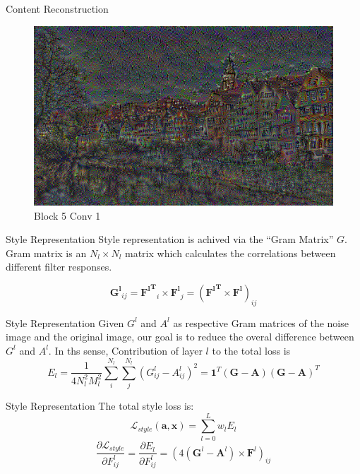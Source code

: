 \documentclass{beamer}
\begin{document}
\begin{frame}{Content Reconstruction}
\begin{figure}[ht]
\centering
\caption{Block 5 Conv 1}
\includegraphics[width=\textwidth]{img/content/block5_conv1.png}
\end{figure}
\end{frame}

\begin{frame}{Style Representation}
Style representation is achived via the ``Gram Matrix'' $G$. Gram matrix is
an $N_l \times N_l$ matrix which calculates the correlations between
different filter responses.

\begin{equation}
    \mathbf{G^l}_{ij} = \mathbf{{F^l}^T}_i \times \mathbf{F^l}_j
    = (\mathbf{{F^l}^T} \times \mathbf{F^l})_{ij}
\end{equation}
\end{frame}

\begin{frame}{Style Representation}
Given $G^l$ and $A^l$ as respective Gram matrices of the
noise image and the original image, our goal is to reduce the overal difference
between $G^l$ and $A^l$. In ths sense,
Contribution of layer $l$ to the total loss is
\begin{equation}
    E_l = \frac{1}{4N_l^2M_l^2} \sum_{i}^{N_l}\sum_{j}^{N_l}{(G^l_{ij} - A^l_{ij})^2}
    = \mathbf{1}^T(\mathbf{G} - \mathbf{A})(\mathbf{G} - \mathbf{A})^T
\end{equation}
\end{frame}

\begin{frame}{Style Representation}
The total style loss is:
\begin{equation}
    \mathcal{L}_{style}(\mathbf{a}, \mathbf{x}) = \sum_{l=0}^L {w_l E_l }
\end{equation}
\begin{equation}
    \frac{\partial \mathcal{L}_{style}}{\partial F^l_{ij}} = \frac{\partial E_l}{\partial F^l_{ij}} =
    (4(\mathbf{G}^l - \mathbf{A}^l) \times \mathbf{F}^l)_{ij}
\end{equation}
\end{frame}
\end{document}
